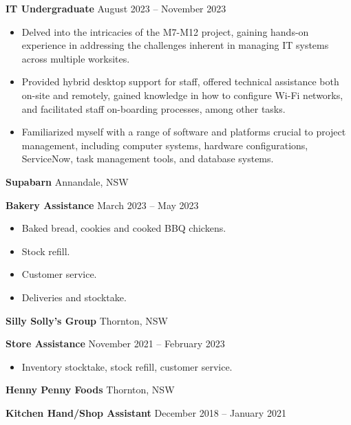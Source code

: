 \documentclass[11pt]{article}
\begin{document}
\textbf{IT Undergraduate} \hfill August 2023 – November 2023
\begin{itemize}[noitemsep, topsep=0pt, partopsep=0pt, parsep=0pt]
    \item Delved into the intricacies of the M7-M12 project, gaining hands-on experience in addressing the challenges inherent in managing IT systems across multiple worksites. 
    \item Provided hybrid desktop support for staff, offered technical assistance both on-site and remotely, gained knowledge in how to configure Wi-Fi networks, and facilitated staff on-boarding processes, among other tasks. 
    \item Familiarized myself with a range of software and platforms crucial to project management, including computer systems, hardware configurations, ServiceNow, task management tools, and database systems. 
\end{itemize}

\vspace{12pt}

\textbf{Supabarn} \hfill Annandale, NSW

\textbf{Bakery Assistance} \hfill March 2023 – May 2023
\begin{itemize}[noitemsep, topsep=0pt, partopsep=0pt, parsep=0pt]
    \item Baked bread, cookies and cooked BBQ chickens.
    \item Stock refill.
    \item Customer service.
    \item Deliveries and stocktake.
\end{itemize}

\vspace{12pt}

\textbf{Silly Solly's Group} \hfill Thornton, NSW

\textbf{Store Assistance} \hfill November 2021 – February 2023
\begin{itemize}[noitemsep, topsep=0pt, partopsep=0pt, parsep=0pt]
    \item Inventory stocktake, stock refill, customer service.
\end{itemize}

\vspace{12pt}

\textbf{Henny Penny Foods} \hfill Thornton, NSW

\textbf{Kitchen Hand/Shop Assistant} \hfill December 2018 – January 2021

\vspace{12pt}
\end{document}
